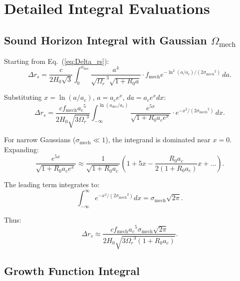 \documentclass[11pt,a4paper]{article}
\newcommand{\fmech}{\ensuremath{f_{\mathrm{mech}}}}
\newcommand{\ac}{\ensuremath{a_c}}
\newcommand{\sigmamech}{\ensuremath{\sigma_{\mathrm{mech}}}}
\newcommand{\adec}{\ensuremath{a_{\mathrm{dec}}}}
\newcommand{\rs}{\ensuremath{r_s}}
\newcommand{\Omr}{\ensuremath{\Omega_r}}
\theoremstyle{definition}
\theoremstyle{remark}
\begin{document}
\appendix

\section{Detailed Integral Evaluations}
\label{app:integrals}

\subsection{Sound Horizon Integral with Gaussian $\Omega_{\mathrm{mech}}$}
\label{app:integral_rs}

Starting from Eq.~(\ref{eq:Delta_rs}):
\begin{equation}
\Delta\rs = \frac{c}{2H_0\sqrt{3}} \int_0^{\adec} \frac{a^4}{\sqrt{\Omr}^3 \sqrt{1+R_0 a}} \cdot \fmech e^{-\ln^2(a/\ac)/(2\sigmamech^2)} \, da.
\end{equation}

Substituting $x = \ln(a/\ac)$, $a = \ac e^x$, $da = \ac e^x dx$:
\begin{equation}
\Delta\rs = \frac{c \fmech \ac^5}{2H_0\sqrt{3\Omr^3}} \int_{-\infty}^{\ln(\adec/\ac)} \frac{e^{5x}}{\sqrt{1+R_0\ac e^x}} \cdot e^{-x^2/(2\sigmamech^2)} \, dx.
\end{equation}

For narrow Gaussians ($\sigmamech \ll 1$), the integrand is dominated near $x = 0$. Expanding:
\begin{equation}
\frac{e^{5x}}{\sqrt{1+R_0\ac e^x}} \approx \frac{1}{\sqrt{1+R_0\ac}} \left( 1 + 5x - \frac{R_0\ac}{2(1+R_0\ac)} x + \ldots \right).
\end{equation}

The leading term integrates to:
\begin{equation}
\int_{-\infty}^{\infty} e^{-x^2/(2\sigmamech^2)} dx = \sigmamech \sqrt{2\pi}.
\end{equation}

Thus:
\begin{equation}
\boxed{\Delta\rs \approx \frac{c \fmech \ac^5 \sigmamech \sqrt{2\pi}}{2H_0\sqrt{3\Omr^3(1+R_0\ac)}}.}
\end{equation}

\subsection{Growth Function Integral}
\label{app:integral_growth}
\end{document}
